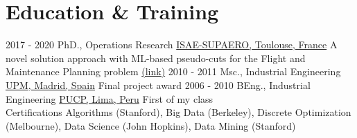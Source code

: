 \documentclass[letterpaper]{twentysecondcv} %
\begin{document}
\section{Education \& Training}

\begin{twenty} %
  \twentyitemshorttest
      {2017 - 2020}
        {}
        {PhD., Operations Research}
        {\href{https://www.isae-supaero.fr/en/}{ISAE-SUPAERO, Toulouse, France}}
        {A novel solution approach with ML-based pseudo-cuts for the Flight and Maintenance Planning problem \href{https://link.springer.com/article/10.1007/s00291-020-00591-z}{(link)}}
  \twentyitemshorttest
      {2010 - 2011}
    {}
        {Msc., Industrial Engineering}
        {\href{https://www.upm.es/internacional}{UPM, Madrid, Spain}}
        {Final project award}
  \twentyitemshorttest
      {2006 - 2010}
    {}
        {BEng., Industrial Engineering}
        {\href{https://www.pucp.edu.pe/}{PUCP, Lima, Peru}}
        {First of my class}
  \\
  \twentyitemshorttest
      {Certifications}
    {}
        {Algorithms (Stanford), Big Data (Berkeley), Discrete Optimization (Melbourne), Data Science (John Hopkins), Data Mining (Stanford)}
        {}
        {}

\end{twenty}
\end{document}
